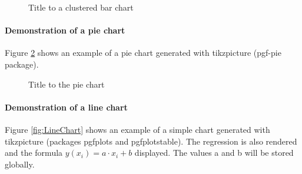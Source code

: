 \begin{figure}
	\centering
	\caption{\label{fig:ClusteredBarChart}Title to a clustered bar chart}
\end{figure}

\paragraph{Demonstration of a pie chart}
Figure \ref{fig:PieChart} shows an example of a pie chart generated with tikzpicture (pgf-pie package).

\begin{figure}
	\centering
	\caption{\label{fig:PieChart}Title to the pie chart}
\end{figure}

\paragraph{Demonstration of a line chart}
Figure \ref{fig:LineChart} shows an example of a simple chart generated with tikzpicture (packages pgfplots and pgfplotstable). 
The regression is also rendered and the formula $ y(x_i) = a \cdot x_i + b$ displayed. The values a and b will be stored globally.

